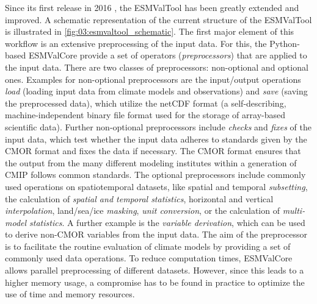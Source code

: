 Since its first release in 2016 \autocite{Eyring2016a}, the \ac{ESMValTool} has
been greatly extended and improved. A schematic representation of the current
structure of the \ac{ESMValTool} is illustrated in
\cref{fig:03:esmvaltool_schematic}. The first major element of this workflow is
an extensive preprocessing of the input data. For this, the Python-based
\acf{ESMValCore} provide a set of operators (\emph{preprocessors}) that are
applied to the input data. There are two classes of preprocessors: non-optional
and optional ones. Examples for non-optional preprocessors are the input/output
operations \emph{load} (loading input data from climate models and
observations) and \emph{save} (saving the preprocessed data), which utilize the
\ac{netCDF} format (a self-describing, machine-independent binary file format
used for the storage of array-based scientific data). Further non-optional
preprocessors include \emph{checks} and \emph{fixes} of the input data, which
test whether the input data adheres to standards given by the \ac{CMOR} format
and fixes the data if necessary. The \ac{CMOR} format ensures that the output
from the many different modeling institutes within a generation of \ac{CMIP}
follows common standards. The optional preprocessors include commonly used
operations on spatiotemporal datasets, like spatial and temporal
\emph{subsetting}, the calculation of \emph{spatial and temporal statistics},
horizontal and vertical \emph{interpolation}, land/sea/ice \emph{masking},
\emph{unit conversion}, or the calculation of \emph{multi-model statistics}. A
further example is the \emph{variable derivation}, which can be used to derive
non-\ac{CMOR} variables from the input data. The aim of the preprocessor is to
facilitate the routine evaluation of climate models by providing a set of
commonly used data operations. To reduce computation times, \ac{ESMValCore}
allows parallel preprocessing of different datasets. However, since this leads
to a higher memory usage, a compromise has to be found in practice to optimize
the use of time and memory resources.

